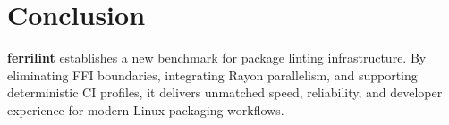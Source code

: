 \documentclass[11pt,a4paper]{article}
\begin{document}
\section{Conclusion}
\textbf{ferrilint} establishes a new benchmark for package linting infrastructure. By eliminating FFI boundaries, integrating Rayon parallelism, and supporting deterministic CI profiles, it delivers unmatched speed, reliability, and developer experience for modern Linux packaging workflows.
\end{document}
